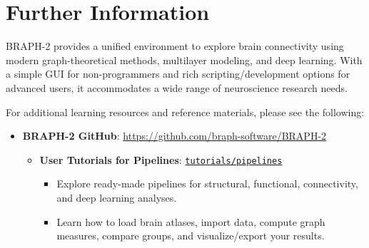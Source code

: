\documentclass[justified]{tufte-handout}
\begin{document}
\section{Further Information}

BRAPH-2 provides a unified environment to explore brain connectivity using modern graph-theoretical methods, multilayer modeling, and deep learning. 
With a simple GUI for non-programmers and rich scripting/development options for advanced users, it accommodates a wide range of neuroscience research needs.

For additional learning resources and reference materials, please see the following:

\begin{itemize}
    \item \textbf{BRAPH-2 GitHub}: \url{https://github.com/braph-software/BRAPH-2}
\begin{itemize}
    \item \textbf{User Tutorials for Pipelines}: 
    \href{https://github.com/braph-software/BRAPH-2/tree/develop/tutorials/pipelines}{\texttt{tutorials/pipelines}}
    \begin{itemize}
        \item Explore ready-made pipelines for structural, functional, connectivity, and deep learning analyses.
        \item Learn how to load brain atlases, import data, compute graph measures, compare groups, and visualize/export your results.
    \end{itemize}


\end{itemize}
\end{itemize}
\end{document}
